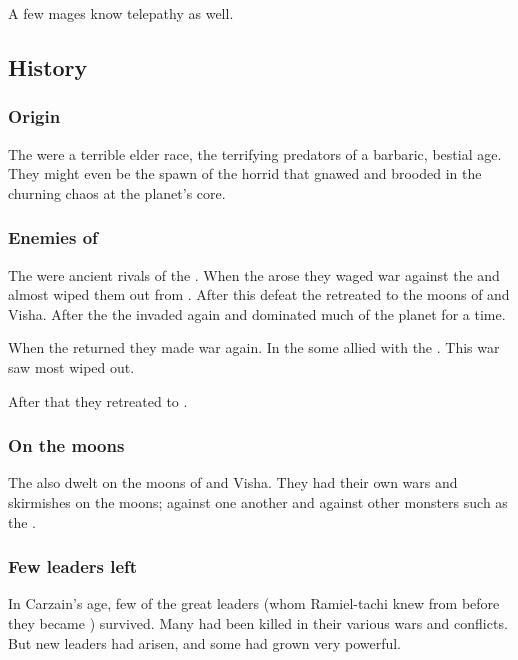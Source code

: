 A few mages know telepathy as well. 









\subsection{History}





\subsubsection{Origin}
The \vorcanths were a terrible elder race, the terrifying predators of a barbaric, bestial age. 
They might even be the spawn of the horrid  that gnawed and brooded in the churning chaos at the planet's core. 





\subsubsection{Enemies of \ophidians}
The \vorcanths{} were ancient rivals of the \ophidians. 
When the \dragons arose they waged war against the \vorcanths and almost wiped them out from \Miith. 
After this defeat the \vorcanths retreated to the moons of \Dun and Visha. 
After the \firstbanewar the \vorcanths invaded \Miith again and dominated much of the planet for a time. 

When the \dragons returned they made war again. 
In the \secondbanewar some \vorcanths allied with the \resphain.
This war saw most \vorcanths wiped out. 

After that they retreated to \Dun.





\subsubsection{On the moons}
The \vorcanths also dwelt on the moons of \Dun and Visha. 
They had their own wars and skirmishes on the moons; against one another and against other monsters such as the . 





\subsubsection{Few leaders left}
In Carzain's age, few of the great \vorcanth{} leaders (whom Ramiel-tachi knew from before they became \malachim) survived. 
Many had been killed in their various wars and conflicts. 
But new leaders had arisen, and some had grown very powerful. 









